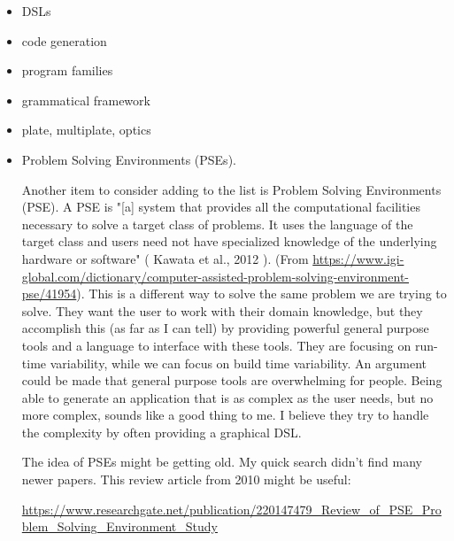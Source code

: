 \documentclass[sigconf,review]{acmart}
\begin{document}
\begin{itemize}
\item DSLs
\item code generation
\item program families
\item grammatical framework
\item plate, multiplate, optics
\item Problem Solving Environments (PSEs).

Another item to consider adding to the list is Problem Solving Environments
(PSE). A PSE is "[a] system that provides all the computational facilities
necessary to solve a target class of problems. It uses the language of the
target class and users need not have specialized knowledge of the underlying
hardware or software" ( Kawata et al., 2012 ). 
(From
\url{https://www.igi-global.com/dictionary/computer-assisted-problem-solving-environment-pse/41954}).
This is a different way to solve the same problem we are trying to solve. They
want the user to work with their domain knowledge, but they accomplish this (as
far as I can tell) by providing powerful general purpose tools and a language
to interface with these tools. They are focusing on run-time variability, while
we can focus on build time variability. An argument could be made that general
purpose tools are overwhelming for people. Being able to generate an
application that is as complex as the user needs, but no more complex, sounds
like a good thing to me. I believe they try to handle the complexity by
often providing a graphical DSL.

The idea of PSEs might be getting old. My quick search didn't find many newer
papers. This review article from 2010 might be useful:

\url{https://www.researchgate.net/publication/220147479_Review_of_PSE_Problem_Solving_Environment_Study}
  
\end{itemize}



\end{document}
